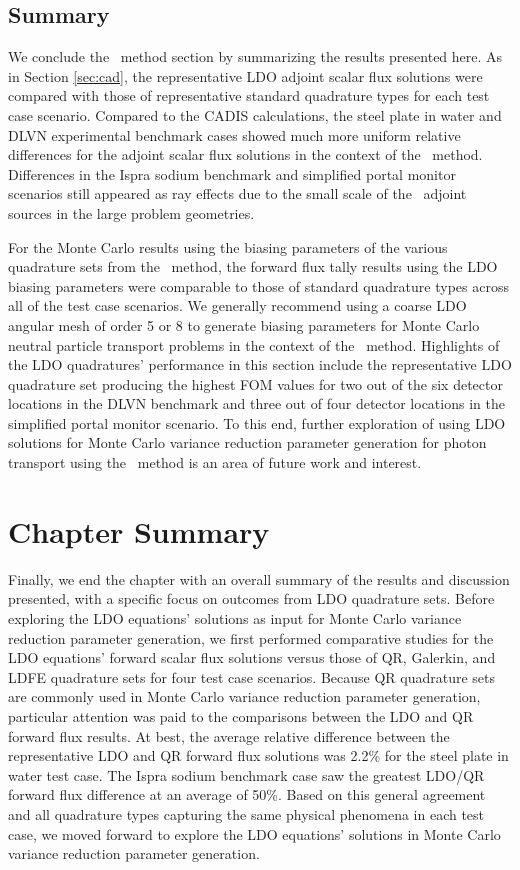 \FloatBarrier
\subsection{Summary}

We conclude the \fwc\ method section by summarizing the results presented here. As in
Section \ref{sec:cad}, the representative LDO adjoint scalar flux solutions were compared with 
those of representative standard quadrature types for each test case scenario. Compared to the 
CADIS calculations, the steel plate in water and DLVN experimental benchmark cases showed much 
more uniform relative differences for the adjoint scalar flux solutions in the context of the
\fwc\ method. Differences in the Ispra sodium benchmark and simplified portal monitor scenarios
still appeared as ray effects due to the small scale of the \fwc\ adjoint sources in the large
problem geometries.

For the Monte Carlo results using the biasing parameters of the various quadrature sets from
the \fwc\ method, the forward flux tally results using the LDO biasing parameters were
comparable to those of standard quadrature types across all of the test case scenarios. We
generally recommend using a coarse LDO angular mesh of order 5 or 8 to generate biasing 
parameters for Monte Carlo neutral particle transport problems in the context of the \fwc\
method. Highlights of the LDO quadratures' performance in this section include the representative
LDO quadrature set producing the highest FOM values for two out of the six detector locations in
the DLVN benchmark and three out of four detector locations in the simplified portal monitor
scenario. To this end, further exploration of using LDO solutions for Monte Carlo variance
reduction parameter generation for photon transport using the \fwc\ method is an area of future
work and interest.

\FloatBarrier
\section{Chapter Summary}

Finally, we end the chapter with an overall summary of the results and discussion presented,
with a specific focus on outcomes from LDO quadrature sets. Before exploring the LDO equations'
solutions as input for Monte Carlo variance reduction parameter generation, we first performed
comparative studies for the LDO equations' forward scalar flux solutions versus those of QR,
Galerkin, and LDFE quadrature sets for four test case scenarios. Because QR quadrature sets are
commonly used in Monte Carlo variance reduction parameter generation, particular attention was
paid to the comparisons between the LDO and QR forward flux results. At best, the average
relative difference between the representative LDO and QR forward flux solutions was 2.2\% for 
the steel plate in water test case. The Ispra sodium benchmark case saw the greatest LDO/QR 
forward flux difference at an average of 50\%. Based on this general agreement and all
quadrature types capturing the same physical phenomena in each test case, we moved forward to 
explore the LDO equations' solutions in Monte Carlo variance reduction parameter generation.

